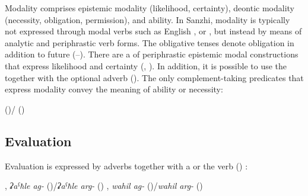 Modality comprises epistemic modality (likelihood, certainty), deontic modality (necessity, obligation, permission), and ability. In Sanzhi, modality is typically not expressed through modal verbs such as English ,  or , but instead by means of analytic and periphrastic verb forms. The obligative tenses denote obligation in addition to future (--). There are a  of periphrastic epistemic modal constructions that express likelihood and certainty (, ). In addition, it is possible to use the  together with the optional adverb   (). The only complement-taking predicates that express modality convey the meaning of ability or necessity:
%
\begin{exe}
	\ex	\label{ex:modal predicates}
	\begin{xlist}
		\ex	{} ()\slash{} () 
		\ex	{} 
		\ex	{} 
	\end{xlist}
\end{exe}



\subsection{Evaluation}
\label{ssec:Evaluation}

Evaluation is expressed by adverbs together with a  or the verb  () :
%
\begin{exe}
	\ex	\label{ex:evaluation verbs}
	\begin{xlist}
		\ex	{}, \textit{ʡaˁħle ag-} ()\slash\textit{ʡaˁħle arg-} () \sqt{be good}
		\ex	{}, \textit{wahil ag-} ()\slash\textit{wahil arg-} () \sqt{be bad}
	\end{xlist}
\end{exe}


